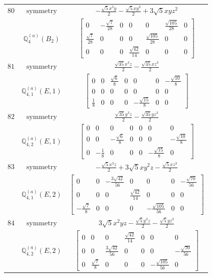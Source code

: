 \documentclass[fleqn,8pt,landscape]{jsarticle}
\begin{document}
\begin{longtable}{ccc}
$ 80 $ & $ \text{symmetry} $ & $ - \frac{\sqrt{5} x^{3} y}{2} - \frac{\sqrt{5} x y^{3}}{2} + 3 \sqrt{5} x y z^{2} $ \\
$  $ & $ \mathbb{Q}_{4}^{(a)}(B_{2}) $ & $ \begin{bmatrix} 0 & - \frac{\sqrt{7}}{28} & 0 & 0 & 0 & \frac{\sqrt{105}}{28} & 0 \\ \frac{\sqrt{7}}{28} & 0 & 0 & 0 & \frac{\sqrt{105}}{28} & 0 & 0 \\ 0 & 0 & 0 & \frac{\sqrt{42}}{14} & 0 & 0 & 0 \end{bmatrix} $ \\ \hline
$ 81 $ & $ \text{symmetry} $ & $ \frac{\sqrt{35} x^{3} z}{2} - \frac{\sqrt{35} x z^{3}}{2} $ \\
$  $ & $ \mathbb{Q}_{4,1}^{(a)}(E,1) $ & $ \begin{bmatrix} 0 & 0 & \frac{\sqrt{6}}{8} & 0 & 0 & 0 & - \frac{\sqrt{10}}{8} \\ 0 & 0 & 0 & 0 & 0 & 0 & 0 \\ \frac{1}{8} & 0 & 0 & 0 & - \frac{\sqrt{15}}{8} & 0 & 0 \end{bmatrix} $ \\ \hline
$ 82 $ & $ \text{symmetry} $ & $ \frac{\sqrt{35} y^{3} z}{2} - \frac{\sqrt{35} y z^{3}}{2} $ \\
$  $ & $ \mathbb{Q}_{4,2}^{(a)}(E,1) $ & $ \begin{bmatrix} 0 & 0 & 0 & 0 & 0 & 0 & 0 \\ 0 & 0 & - \frac{\sqrt{6}}{8} & 0 & 0 & 0 & - \frac{\sqrt{10}}{8} \\ 0 & - \frac{1}{8} & 0 & 0 & 0 & - \frac{\sqrt{15}}{8} & 0 \end{bmatrix} $ \\ \hline
$ 83 $ & $ \text{symmetry} $ & $ - \frac{\sqrt{5} x^{3} z}{2} + 3 \sqrt{5} x y^{2} z - \frac{\sqrt{5} x z^{3}}{2} $ \\
$  $ & $ \mathbb{Q}_{4,1}^{(a)}(E,2) $ & $ \begin{bmatrix} 0 & 0 & - \frac{3 \sqrt{42}}{56} & 0 & 0 & 0 & - \frac{\sqrt{70}}{56} \\ 0 & 0 & 0 & \frac{\sqrt{42}}{14} & 0 & 0 & 0 \\ - \frac{\sqrt{7}}{8} & 0 & 0 & 0 & - \frac{\sqrt{105}}{56} & 0 & 0 \end{bmatrix} $ \\ \hline
$ 84 $ & $ \text{symmetry} $ & $ 3 \sqrt{5} x^{2} y z - \frac{\sqrt{5} y^{3} z}{2} - \frac{\sqrt{5} y z^{3}}{2} $ \\
$  $ & $ \mathbb{Q}_{4,2}^{(a)}(E,2) $ & $ \begin{bmatrix} 0 & 0 & 0 & \frac{\sqrt{42}}{14} & 0 & 0 & 0 \\ 0 & 0 & \frac{3 \sqrt{42}}{56} & 0 & 0 & 0 & - \frac{\sqrt{70}}{56} \\ 0 & \frac{\sqrt{7}}{8} & 0 & 0 & 0 & - \frac{\sqrt{105}}{56} & 0 \end{bmatrix} $ \\ \hline

\end{longtable}
\end{document}
